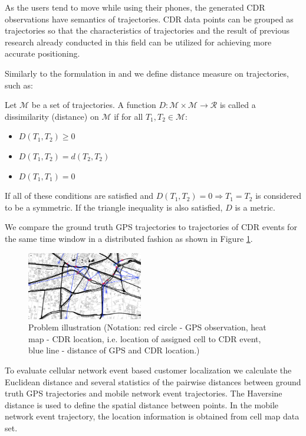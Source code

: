 As the users tend to move while using their phones, the generated CDR observations have semantics of trajectories. CDR data points can be grouped as trajectories so that the characteristics of trajectories and the result of previous research already conducted in this field can be utilized for achieving more accurate positioning.

Similarly to the formulation in \cite{encyclopedia} and \cite{distance-def} we define distance measure on trajectories, such as:
\begin{definition}
Let $\mathcal{M}$ be a set of trajectories. A function $D :\mathcal{M} \times \mathcal{M} \rightarrow \mathcal{R}$  is called a dissimilarity (distance) on $\mathcal{M}$ if for all $T_{1}, T_{2} \in \mathcal{M}$: 
\begin{itemize}
    \item $D(T_{1},T_{2}) \geqslant 0$
    \item $D(T_{1},T_{2}) = d(T_{2},T_{2})$
    \item $D(T_{1},T_{1}) = 0$
\end{itemize}
If all of these conditions are satisfied and $D(T_{1}, T_{2}) = 0 \Rightarrow  T_{1} = T_{2} $ is considered to be a symmetric. If
the triangle inequality is also satisfied, $D$ is a metric.
\end{definition}

We compare the ground truth GPS trajectories to trajectories of CDR events for the same time window in a distributed fashion as shown in Figure \ref{fig:problem}. 
\begin{figure}[h]
    \centering
    \includegraphics[width=0.45\textwidth]{images/localization_eval.png}
    \caption{Problem illustration (Notation: red circle - GPS observation, heat map - CDR location, i.e. location of assigned cell to CDR event, blue line - distance of GPS and CDR location.)}
    \label{fig:problem}
\end{figure}

To evaluate cellular network event based customer localization we calculate the Euclidean distance and several statistics of the pairwise distances between ground truth GPS trajectories and mobile network event trajectories. The Haversine distance is used to define the spatial distance between points. In the mobile network event trajectory, the location information is obtained from cell map data set.

